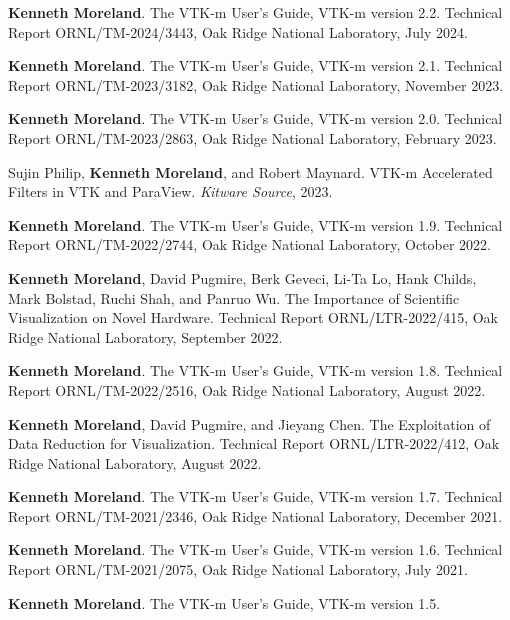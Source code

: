 \begin{enumerate}[label={[\arabic*]}, left=0pt]
\item  %
  \textbf{Kenneth Moreland}.
  The {VTK-m} User's Guide, {VTK-m} version 2.2.
Technical Report ORNL/TM-2024/3443, Oak Ridge National Laboratory, July 2024.
\item  %
  \textbf{Kenneth Moreland}.
  The {VTK-m} User's Guide, {VTK-m} version 2.1.
Technical Report ORNL/TM-2023/3182, Oak Ridge National Laboratory, November 2023.
\item  %
  \textbf{Kenneth Moreland}.
  The {VTK-m} User's Guide, {VTK-m} version 2.0.
Technical Report ORNL/TM-2023/2863, Oak Ridge National Laboratory, February 2023.
\item  %
  Sujin Philip, \textbf{Kenneth Moreland}, and Robert Maynard.
  {VTK-m} Accelerated Filters in {VTK} and {ParaView}.
\emph{Kitware Source}, 2023.
\item  %
  \textbf{Kenneth Moreland}.
  The {VTK-m} User's Guide, {VTK-m} version 1.9.
Technical Report ORNL/TM-2022/2744, Oak Ridge National Laboratory, October 2022.
\item  %
  \textbf{Kenneth Moreland}, David Pugmire, Berk Geveci, Li-Ta Lo, Hank Childs, Mark Bolstad, Ruchi Shah, and Panruo Wu.
  The Importance of Scientific Visualization on Novel Hardware.
Technical Report ORNL/LTR-2022/415, Oak Ridge National Laboratory, September 2022.
\item  %
  \textbf{Kenneth Moreland}.
  The {VTK-m} User's Guide, {VTK-m} version 1.8.
Technical Report ORNL/TM-2022/2516, Oak Ridge National Laboratory, August 2022.
\item  %
  \textbf{Kenneth Moreland}, David Pugmire, and Jieyang Chen.
  The Exploitation of Data Reduction for Visualization.
Technical Report ORNL/LTR-2022/412, Oak Ridge National Laboratory, August 2022.
\item  %
  \textbf{Kenneth Moreland}.
  The {VTK-m} User's Guide, {VTK-m} version 1.7.
Technical Report ORNL/TM-2021/2346, Oak Ridge National Laboratory, December 2021.
\item  %
  \textbf{Kenneth Moreland}.
  The {VTK-m} User's Guide, {VTK-m} version 1.6.
Technical Report ORNL/TM-2021/2075, Oak Ridge National Laboratory, July 2021.
\item  %
  \textbf{Kenneth Moreland}.
  The {VTK-m} User's Guide, {VTK-m} version 1.5.

\end{enumerate}
